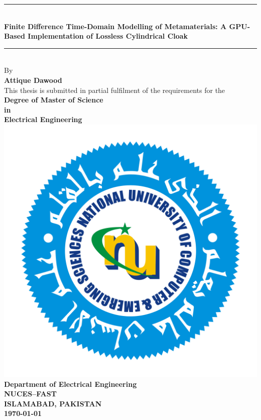 
\begin{titlepage}
\begin{center}

\rule{\linewidth}{0.5mm}\\[0.3cm]
{\Large \bfseries Finite Difference Time-Domain Modelling of Metamaterials: A GPU-Based Implementation of Lossless Cylindrical Cloak}\\
\rule{\linewidth}{0.5mm}\\[0.5cm]

{\large By}\\[0.5cm]
{\large \bfseries Attique Dawood}\\[1cm]

{\large This thesis is submitted in partial fulfilment of the requirements for the}\\[1cm]
{\large \bfseries Degree of Master of Science\\[0.2cm] in\\[0.2cm] Electrical Engineering}\\[2cm]

\includegraphics[scale=0.15]{Figures/NU_Logo.png}\\[2cm]

{\large \bfseries Department of Electrical Engineering}\\[0.2cm]
{\large \bfseries NUCES--FAST}\\[0.2cm]
{\large \bfseries ISLAMABAD, PAKISTAN}\\[0.2cm]
{\large \bfseries \today}

\end{center}
\end{titlepage}